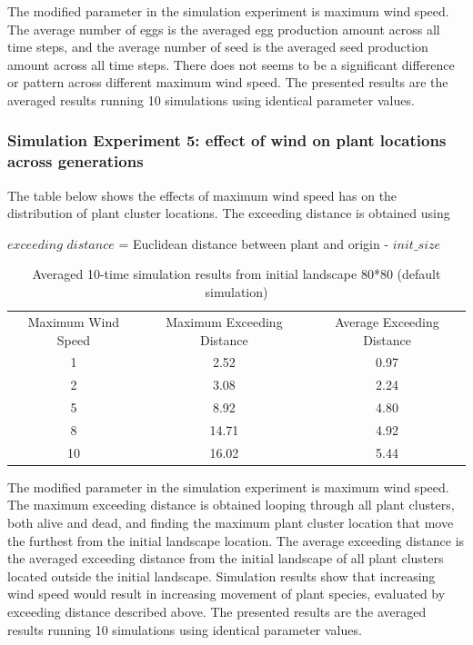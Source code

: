 \documentclass[3p,,preprint,12pt]{elsarticle}
\begin{document}
The modified parameter in the simulation experiment is maximum wind speed. The average number of eggs is the averaged egg production amount across all time steps, and the average number of seed is the averaged seed production amount across all time steps. There does not seems to be a significant difference or pattern across different maximum wind speed. The presented results are the averaged results running 10 simulations using identical parameter values.

\subsubsection{Simulation Experiment 5: effect of wind on plant locations across generations}
The table below shows the effects of maximum wind speed has on the distribution of plant cluster locations. The exceeding distance is obtained using
    \begin{center}
    $exceeding$ $distance$ = Euclidean distance between plant and origin - $init\_size$
    \end{center}

    \begin{table}[!htb]
    \begin{center}
    \begin{tabular}{ c c c }
    Maximum Wind Speed & Maximum Exceeding Distance & Average Exceeding Distance \\
    1 & 2.52 & 0.97 \\
    2 & 3.08 & 2.24 \\
    5 & 8.92 & 4.80 \\ 
    8 & 14.71 & 4.92 \\
    10 & 16.02 & 5.44\\
    \end{tabular}
    \caption{\label{tab:table-name} Averaged 10-time simulation results from initial landscape 80*80 (default simulation)}
    \end{center}
    \end{table}

The modified parameter in the simulation experiment is maximum wind speed. The maximum exceeding distance is obtained looping through all plant clusters, both alive and dead, and finding the maximum plant cluster location that move the furthest from the initial landscape location. The average exceeding distance is the averaged exceeding distance from the initial landscape of all plant clusters located outside the initial landscape. Simulation results show that increasing wind speed would result in increasing movement of plant species, evaluated by exceeding distance described above. The presented results are the averaged results running 10 simulations using identical parameter values.
\end{document}
